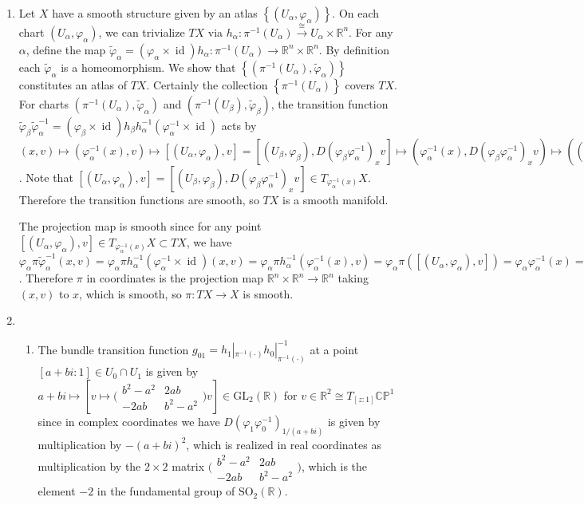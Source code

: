 \documentclass[11pt,leqno]{article}
\theoremstyle{plain}
\theoremstyle{definition}
\numberwithin{equation}{section}
\numberwithin{lem}{section}
\newcommand{\cbr}[1]{\left\{#1\right\}}
\DeclareMathOperator{\id}{id}
\newcommand{\GL}{\mathrm{GL}}
\newcommand{\SO}{\mathrm{SO}}
\begin{document}
\begin{enumerate}
    \item Let $X$ have a smooth structure given by an atlas $\cbr{(U_\alpha,\varphi_\alpha)}$. On each chart $(U_\alpha,\varphi_\alpha)$, we can trivialize $TX$ via $h_\alpha\colon \pi^{-1}(U_\alpha)\xrightarrow{\cong} U_\alpha\times \mathbb R^n$. For any $\alpha$, define the map $\tilde\varphi_\alpha = (\varphi_\alpha\times \id)h_\alpha \colon \pi^{-1}(U_\alpha) \to \mathbb R^n\times \mathbb R^n$. By definition each $\tilde\varphi_\alpha$ is a homeomorphism. We show that $\cbr{(\pi^{-1}(U_\alpha), \tilde\varphi_\alpha)}$ constitutes an atlas of $TX$. Certainly the collection $\cbr{\pi^{-1}(U_\alpha)}$ covers $TX$. For charts $(\pi^{-1}(U_\alpha), \tilde\varphi_\alpha)$ and $(\pi^{-1}(U_\beta), \tilde\varphi_\beta)$, the transition function $\tilde\varphi_\beta\tilde\varphi_\alpha^{-1} = (\varphi_\beta\times \id)h_\beta h_\alpha^{-1}(\varphi_\alpha^{-1}\times\id)$ acts by $(x,v)\mapsto (\varphi_\alpha^{-1}(x),v)\mapsto [(U_\alpha,\varphi_\alpha),v] = [(U_\beta,\varphi_\beta),D(\varphi_\beta\varphi_\alpha^{-1})_{x}v]\mapsto (\varphi_\alpha^{-1}(x),D(\varphi_\beta\varphi_\alpha^{-1})_{x}v)\mapsto ((\varphi_\beta\varphi_\alpha^{-1})(x),D(\varphi_\beta\varphi_\alpha^{-1})_{x}v)$. Note that $[(U_\alpha,\varphi_\alpha),v] = [(U_\beta,\varphi_\beta),D(\varphi_\beta\varphi_\alpha^{-1})_{x}v]\in T_{\varphi_\alpha^{-1}(x)}X$. Therefore the transition functions are smooth, so $TX$ is a smooth manifold.
    
    The projection map is smooth since for any point $[(U_\alpha,\varphi_\alpha),v]\in T_{\varphi_\alpha^{-1}(x)}X\subset TX$, we have $\varphi_\alpha \pi \tilde\varphi_\alpha^{-1}(x,v) = \varphi_\alpha\pi h_\alpha^{-1}(\varphi_\alpha^{-1}\times \id)(x,v) = \varphi_\alpha\pi h_\alpha^{-1}(\varphi_\alpha^{-1}(x),v) = \varphi_\alpha\pi([(U_\alpha,\varphi_\alpha),v]) = \varphi_\alpha\varphi_\alpha^{-1}(x) = x$. Therefore $\pi$ in coordinates is the projection map $\mathbb R^n\times \mathbb R^n\to \mathbb R^n$ taking $(x,v)$ to $x$, which is smooth, so $\pi\colon TX\to X$ is smooth.
    \item \begin{enumerate}
        \item The bundle transition function $g_{01} = h_1|_{\pi^{-1}(\cdot)}h_0|_{\pi^{-1}(\cdot)}^{-1}$ at a point $[a+bi:1]\in U_0\cap U_1$ is given by $a+bi\mapsto [v\mapsto \big(\!\begin{smallmatrix}
            b^2-a^2 & 2ab \\ -2ab & b^2-a^2
        \end{smallmatrix}\!\big)v]\in \GL_2(\mathbb R)$ for $v\in \mathbb R^2 \cong T_{[z:1]}\mathbb{CP}^1$ since in complex coordinates we have $D(\varphi_1\varphi_0^{-1})_{1/(a+bi)}$ is given by multiplication by $ -(a+bi)^2$, which is realized in real coordinates as multiplication by the $2\times 2$ matrix $\big(\!\begin{smallmatrix}
            b^2-a^2 & 2ab \\ -2ab & b^2-a^2
        \end{smallmatrix}\!\big)$, which is the element $-2$ in the fundamental group of $\SO_2(\mathbb R)$. 
        

\end{enumerate}
\end{enumerate}
\end{document}
